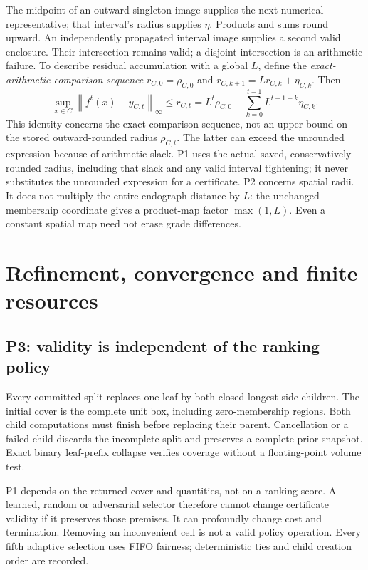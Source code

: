 \documentclass[10pt,a4paper]{article}
\newcommand{\norm}[1]{\left\lVert#1\right\rVert_{\infty}}
\begin{document}
The midpoint of an outward singleton image supplies the next numerical
representative; that interval's radius supplies $\eta$. Products and sums
round upward. An independently propagated interval image supplies a second
valid enclosure. Their intersection remains valid; a disjoint intersection
is an arithmetic failure. To describe residual accumulation with a global
$L$, define the \emph{exact-arithmetic comparison sequence}
$r_{C,0}=\rho_{C,0}$ and $r_{C,k+1}=Lr_{C,k}+\eta_{C,k}$. Then
\begin{equation}\label{eq:residuals}
 \sup_{x\in C}\norm{f^t(x)-y_{C,t}}\leq r_{C,t}
 = L^t\rho_{C,0}
  +\sum_{k=0}^{t-1}L^{t-1-k}\eta_{C,k}.
\end{equation}
This identity concerns the exact comparison sequence, not an upper bound on
the stored outward-rounded radius $\rho_{C,t}$. The latter can exceed the
unrounded expression because of arithmetic slack. P1 uses the actual saved,
conservatively rounded radius, including that slack and any valid interval
tightening; it never substitutes the unrounded expression for a certificate.
P2 concerns spatial radii. It does not multiply the entire endograph distance
by $L$: the unchanged membership coordinate gives a product-map factor
$\max(1,L)$. Even a constant spatial map need not erase grade differences.

\section{Refinement, convergence and finite resources}
\subsection{P3: validity is independent of the ranking policy}
Every committed split replaces one leaf by both closed longest-side children.
The initial cover is the complete unit box, including zero-membership regions.
Both child computations must finish before replacing their parent. Cancellation
or a failed child discards the incomplete split and preserves a complete prior
snapshot. Exact binary leaf-prefix collapse verifies coverage without a
floating-point volume test.

P1 depends on the returned cover and quantities, not on a ranking score.
A learned, random or adversarial selector therefore cannot change certificate
validity if it preserves those premises. It can profoundly change cost and
termination. Removing an inconvenient cell is not a valid policy operation.
Every fifth adaptive selection uses FIFO fairness; deterministic ties and
child creation order are recorded.
\end{document}
